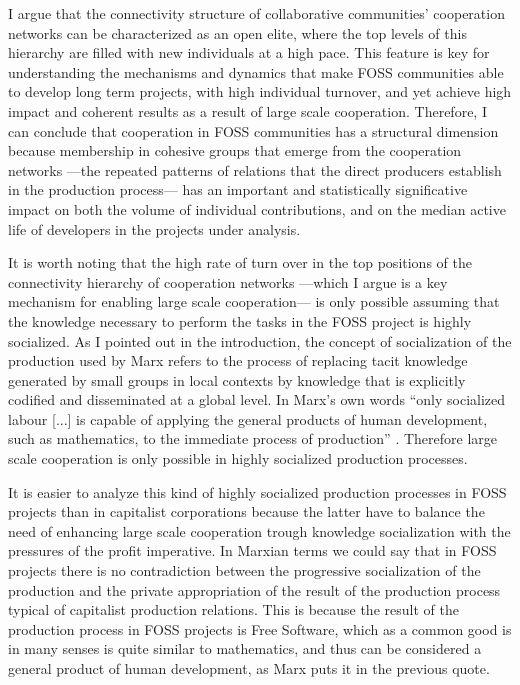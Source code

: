 I argue that the connectivity structure of collaborative communities' cooperation networks can be characterized as an open elite, where the top levels of this hierarchy are filled with new individuals at a high pace. This feature is key for understanding the mechanisms and dynamics that make FOSS communities able to develop long term projects, with high individual turnover, and yet achieve high impact and coherent results as a result of large scale cooperation. Therefore, I can conclude that cooperation in FOSS communities has a structural dimension because membership in cohesive groups that emerge from the cooperation networks ---the repeated patterns of relations that the direct producers establish in the production process--- has an important and statistically significative impact on both the volume of individual contributions, and on the median active life of developers in the projects under analysis.

It is worth noting that the high rate of turn over in the top positions of the connectivity hierarchy of cooperation networks ---which I argue is a key mechanism for enabling large scale cooperation--- is only possible assuming that the knowledge necessary to perform the tasks in the FOSS project is highly socialized. As I pointed out in the introduction, the concept of socialization of the production used by Marx refers to the process of replacing tacit knowledge generated by small groups in local contexts by knowledge that is explicitly codified and disseminated at a global level. In Marx's own words ``only socialized labour [...] is capable of applying the general products of human development, such as mathematics, to the immediate process of production'' \citep[1024]{marx:1990}. Therefore large scale cooperation is only possible in highly socialized production processes.

It is easier to analyze this kind of highly socialized production processes in FOSS projects than in capitalist corporations because the latter have to balance the need of enhancing large scale cooperation trough knowledge socialization with the pressures of the profit imperative. In Marxian terms we could say that in FOSS projects there is no contradiction between the progressive socialization of the production and the private appropriation of the result of the production process typical of capitalist production relations. This is because the result of the production process in FOSS projects is Free Software, which as a common good is in many senses is quite similar to mathematics, and thus can be considered a general product of human development, as Marx puts it in the previous quote.

